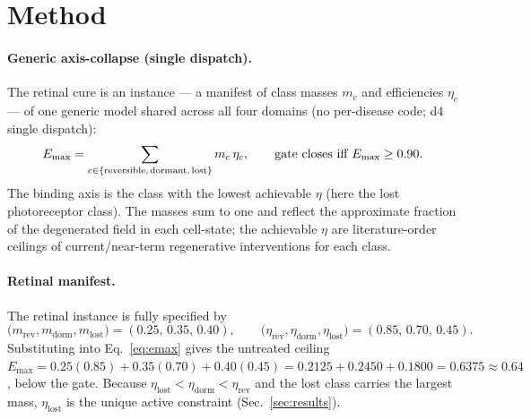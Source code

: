 \documentclass[11pt,a4paper]{article}
\begin{document}
\section{Method}
\label{sec:method}
\paragraph{Generic axis-collapse (single dispatch).} The retinal cure is an instance --- a
manifest of class masses $m_c$ and efficiencies $\eta_c$ --- of one generic model shared across
all four domains (no per-disease code; d4 single dispatch):
\begin{equation}
E_{\max} = \sum_{c\in\{\text{reversible,\,dormant,\,lost}\}} m_c\,\eta_c, \qquad
\text{gate closes iff } E_{\max}\geq 0.90 .
\label{eq:emax}
\end{equation}
The binding axis is the class with the lowest achievable $\eta$ (here the lost photoreceptor
class). The masses sum to one and reflect the approximate fraction of the degenerated field in
each cell-state; the achievable $\eta$ are literature-order ceilings of current/near-term
regenerative interventions for each class.

\paragraph{Retinal manifest.} The retinal instance is fully specified by
\begin{equation}
\big(m_{\text{rev}},m_{\text{dorm}},m_{\text{lost}}\big)=(0.25,\,0.35,\,0.40),\qquad
\big(\eta_{\text{rev}},\eta_{\text{dorm}},\eta_{\text{lost}}\big)=(0.85,\,0.70,\,0.45).
\label{eq:manifest}
\end{equation}
Substituting into Eq.~\eqref{eq:emax} gives the untreated ceiling
$E_{\max}=0.25(0.85)+0.35(0.70)+0.40(0.45)=0.2125+0.2450+0.1800=0.6375\approx 0.64$,
below the gate. Because $\eta_{\text{lost}}<\eta_{\text{dorm}}<\eta_{\text{rev}}$ and the lost
class carries the largest mass, $\eta_{\text{lost}}$ is the unique active constraint
(Sec.~\ref{sec:results}).
\end{document}
